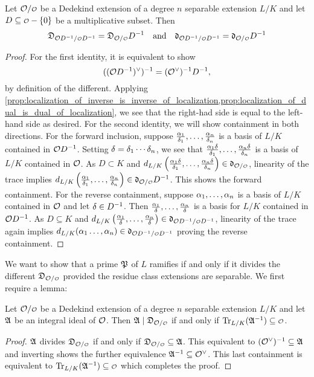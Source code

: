     \begin{proposition}\label{prop:different_and_discriminant_respect_localization}
      Let $\mc{O}/\smc{O}$ be a Dedekind extension of a degree $n$ separable extension $L/K$ and let $D \subseteq \smc{O}-\{0\}$ be a multiplicative subset. Then
      \[
        \mf{D}_{\mc{O}D^{-1}/\smc{O}D^{-1}} = \mf{D}_{\mc{O}/\smc{O}}D^{-1} \quad \text{and} \quad \mf{d}_{\mc{O}D^{-1}/\smc{O}D^{-1}} = \mf{d}_{\mc{O}/\smc{O}}D^{-1}
      \]
    \end{proposition}
    \begin{proof}
      For the first identity, it is equivalent to show
      \[
        ((\mathcal{O}D^{-1})^{\vee})^{-1} = (\mathcal{O}^{\vee})^{-1}D^{-1},
      \]
      by definition of the different. Applying \cref{prop:localization_of_inverse_is_inverse_of_localization,prop:localization_of_dual_is_dual_of_localization}, we see that the right-had side is equal to the left-hand side as desired. For the second identity, we will show containment in both directions. For the forward inclusion, suppose $\frac{\alpha_{1}}{\delta_{1}},\ldots,\frac{\alpha_{n}}{\delta_{n}}$ is a basis of $L/K$ contained in $\mathcal{O}D^{-1}$. Setting $\delta = \delta_{1} \cdots \delta_{n}$, we see that $\frac{\alpha_{1}\delta}{\delta_{1}},\ldots,\frac{\alpha_{n}\delta}{\delta_{n}}$ is a basis of $L/K$ contained in $\mathcal{O}$. As $D \subset K$ and $d_{L/K}\left(\frac{\a_{1}\d}{\d_{1}},\ldots,\frac{\a_{n}\d}{\d_{n}}\right) \in \mf{d}_{\mc{O}/\smc{O}}$, linearity of the trace implies $d_{L/K}\left(\frac{\a_{1}}{\d_{1}},\ldots,\frac{\a_{n}}{\d_{n}}\right) \in \mf{d}_{\mc{O}/\smc{O}}D^{-1}$. This shows the forward containment. For the reverse containment, suppose $\alpha_{1},\ldots,\alpha_{n}$ is a basis of $L/K$ contained in $\mathcal{O}$ and let $\delta \in D^{-1}$. Then $\frac{\alpha_{1}}{\delta},\ldots,\frac{\alpha_{n}}{\delta}$ is a basis for $L/K$ contained in $\mathcal{O}D^{-1}$. As $D \subseteq K$ and $d_{L/K}\left(\frac{\a_{1}}{\d},\ldots,\frac{\a_{n}}{\d}\right) \in \mf{d}_{\mc{O}D^{-1}/\smc{O}D^{-1}}$, linearity of the trace again implies $d_{L/K}(\a_{1}\ldots,\a_{n}) \in \mf{d}_{\mc{O}D^{-1}/\smc{O}D^{-1}}$ proving the reverse containment.
    \end{proof}

    We want to show that a prime $\mathfrak{P}$ of $L$ ramifies if and only if it divides the different $\mf{D}_{\mc{O}/\smc{O}}$ provided the residue class extensions are separable. We first require a lemma:

    \begin{lemma}\label{lem:different_containment_lemma}
      Let $\mc{O}/\smc{O}$ be a Dedekind extension of a degree $n$ separable extension $L/K$ and let $\mathfrak{A}$ be an integral ideal of $\mathcal{O}$. Then $\mf{A} \mid \mf{D}_{\mc{O}/\smc{O}}$ if and only if $\Trace_{L/K}(\mf{A}^{-1}) \subseteq \smc{O}$.
    \end{lemma}
    \begin{proof}
      $\mathfrak{A}$ divides $\mf{D}_{\mc{O}/\smc{O}}$ if and only if $\mf{D}_{\mc{O}/\smc{O}} \subseteq \mf{A}$. This equivalent to $(\mathcal{O}^{\vee})^{-1} \subseteq \mathfrak{A}$ and inverting shows the further equivalence $\mathfrak{A}^{-1} \subseteq \mathcal{O}^{\vee}$. This last containment is equivalent to $\Trace_{L/K}(\mf{A}^{-1}) \subseteq \smc{O}$ which completes the proof.
    \end{proof}

